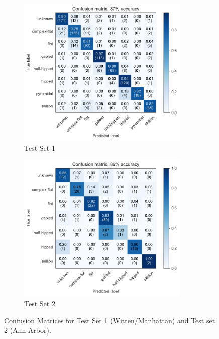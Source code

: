 \begin{figure}[t!]
    \centering
    \begin{subfigure}[t]{0.50\columnwidth}
        \centering
        \includegraphics[width=0.90\textwidth]{chapter_4_roofshape/imgs/allclasses_combined_dual.pdf}
        \caption{Test Set     1}
        \label{fig:dual_test_combined_cm}
    \end{subfigure}
    \hfill
    \begin{subfigure}[t]{0.49\columnwidth}
        \centering
        \includegraphics[width=0.90\textwidth]{chapter_4_roofshape/imgs/allclasses_aa_annarbor_dual.pdf}
        \caption{Test Set     2}
        \label{fig:dual_test_annarbor_cm}
    \end{subfigure}
    \vspace{-14pt}
    \caption[Confusion Matrices for both Test Sets]{Confusion Matrices for Test Set 1 (Witten/Manhattan) and Test set 2 (Ann Arbor). }
    \label{fig:dual_tes_cm}
    \hfill
\end{figure}

